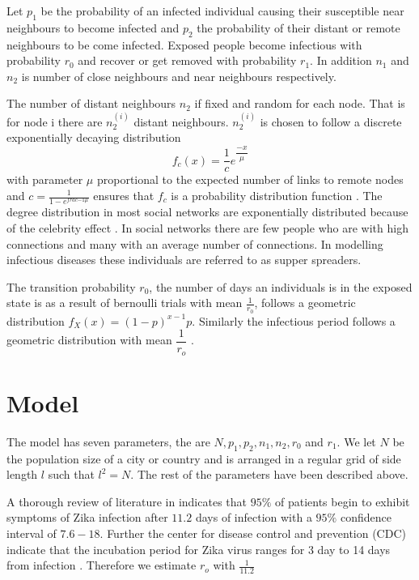 Let $p_1$ be the probability of an infected individual causing their susceptible near neighbours to become infected and $p_2$ the probability of their distant or remote neighbours to be come infected. Exposed people become infectious with probability $r_0$ and recover or get removed with probability $r_1$. In addition $n_1$ and $n_2$ is number of close neighbours and near neighbours respectively.

The number of distant neighbours $n_2$ if fixed and random for each node. That is for node i there are $n_2^{(i)} $ distant neighbours. $n_2^{(i)} $ is chosen to follow a discrete exponentially decaying distribution 
\begin{equation}
f_c(x) = \dfrac{1}{c} e^{\dfrac{-x}{\mu}}
\end{equation}
with  parameter $\mu$ proportional to the expected number of links to remote nodes and $c = \frac{1}{1- e^{frac{-1}{\mu}}}$ ensures that $f_c$ is a probability distribution function \citep{fu2013propagation}. The degree distribution in most social networks are exponentially distributed because of the celebrity effect \citep{estrada2015first}. In social networks there are few people who are with high connections and many with an average number of connections. In modelling infectious diseases these individuals are referred to as supper spreaders.

The transition probability $r_0$, the number of days an individuals is in the exposed state is as a result of bernoulli trials with mean $\frac{1}{r_0}$, follows a geometric distribution $f_X(x) = (1-p)^{x-1}p$. Similarly the infectious period follows a geometric distribution with mean $\dfrac{1}{r_o}$ \citep{fu2013propagation}.

\section{Model}
The model has seven parameters, the are $N, p_1,p_2, n_1, n_2,r_0$ and $r_1$. We let $N$ be the population size of a city or  country and is arranged in a regular grid  of side length $l $ such that $l^2 = N$. The rest of the parameters have been described above.

A  thorough review of literature in \cite{lessler2016times} indicates that $95 \%$ of patients begin to exhibit symptoms of Zika infection after $11.2$ days of infection with a $95 \%$ confidence interval of $7.6 -18$. Further the center for disease control and prevention (CDC) indicate that the incubation period for Zika virus ranges for 3 day to 14 days from infection \citep{krow2017estimated}. Therefore we estimate $r_o$  with $\frac{1}{11.2}$

